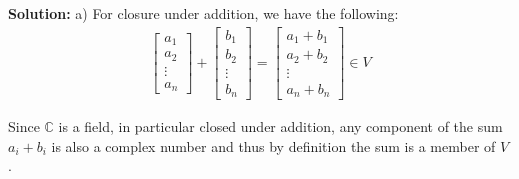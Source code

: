\documentclass{article}
\begin{document}
\noindent\textbf{Solution:} a) For closure under addition, we have the following:
\begin{align*}
    \begin{bmatrix}
        a_1 \\
        a_2\\
        \vdots\\
        a_n
    \end{bmatrix}+\begin{bmatrix}
        b_1 \\
        b_2\\
        \vdots\\
        b_n
    \end{bmatrix}=\begin{bmatrix}
        a_1+b_1 \\
        a_2+b_2\\
        \vdots\\
        a_n+b_n
    \end{bmatrix}\in V\tag{VS1}
\end{align*}

Since $\mathbb C$ is a field, in particular closed under addition, any component of the sum $a_i+b_i$ is also a complex number and thus by definition the sum is a member of $V$.
\end{document}
